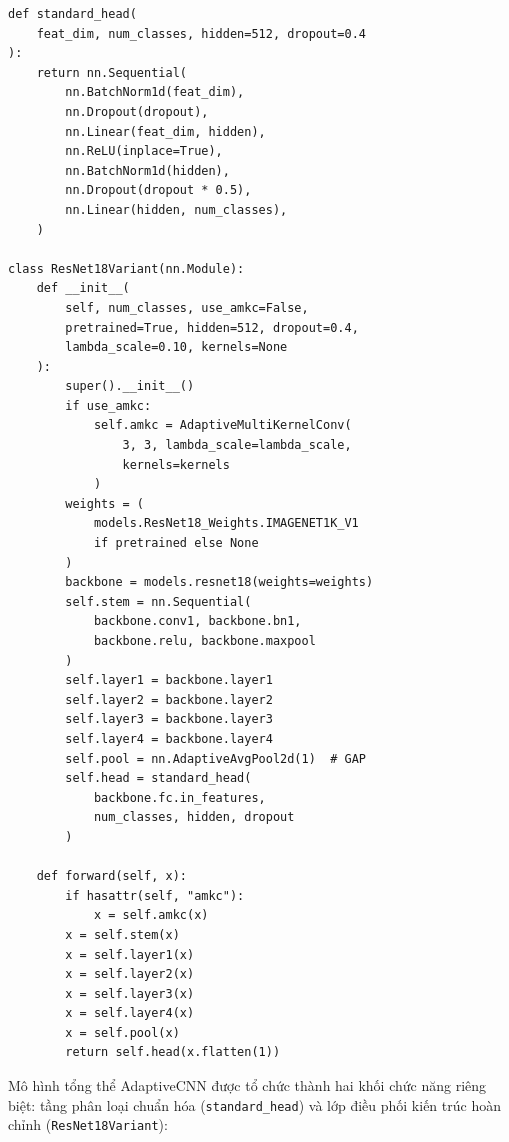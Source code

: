 \begin{lstlisting}[caption={Cài đặt kiến trúc AdaptiveCNN (ResNet-18 + AMKC + GAP)}]
def standard_head(
    feat_dim, num_classes, hidden=512, dropout=0.4
):
    return nn.Sequential(
        nn.BatchNorm1d(feat_dim),
        nn.Dropout(dropout),
        nn.Linear(feat_dim, hidden),
        nn.ReLU(inplace=True),
        nn.BatchNorm1d(hidden),
        nn.Dropout(dropout * 0.5),
        nn.Linear(hidden, num_classes),
    )

class ResNet18Variant(nn.Module):
    def __init__(
        self, num_classes, use_amkc=False,
        pretrained=True, hidden=512, dropout=0.4,
        lambda_scale=0.10, kernels=None
    ):
        super().__init__()
        if use_amkc:
            self.amkc = AdaptiveMultiKernelConv(
                3, 3, lambda_scale=lambda_scale,
                kernels=kernels
            )
        weights = (
            models.ResNet18_Weights.IMAGENET1K_V1
            if pretrained else None
        )
        backbone = models.resnet18(weights=weights)
        self.stem = nn.Sequential(
            backbone.conv1, backbone.bn1,
            backbone.relu, backbone.maxpool
        )
        self.layer1 = backbone.layer1
        self.layer2 = backbone.layer2
        self.layer3 = backbone.layer3
        self.layer4 = backbone.layer4
        self.pool = nn.AdaptiveAvgPool2d(1)  # GAP
        self.head = standard_head(
            backbone.fc.in_features,
            num_classes, hidden, dropout
        )

    def forward(self, x):
        if hasattr(self, "amkc"):
            x = self.amkc(x)
        x = self.stem(x)
        x = self.layer1(x)
        x = self.layer2(x)
        x = self.layer3(x)
        x = self.layer4(x)
        x = self.pool(x)
        return self.head(x.flatten(1))
\end{lstlisting}
Mô hình tổng thể AdaptiveCNN được tổ chức thành hai khối chức năng riêng biệt: tầng phân loại chuẩn hóa (\texttt{standard\_head}) và lớp điều phối kiến trúc hoàn chỉnh (\texttt{ResNet18Variant}):
